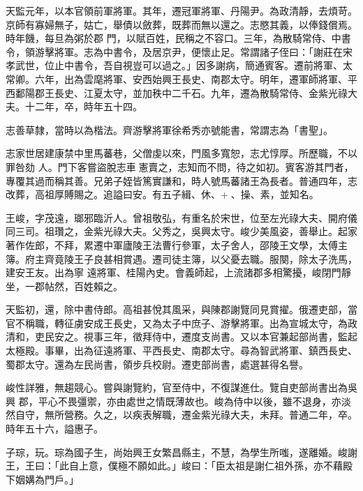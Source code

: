 \begin{pinyinscope}
 天監元年，以本官領前軍將軍。其年，遷冠軍將軍、丹陽尹。為政清靜，去煩苛。京師有寡婦無子，姑亡，舉債以斂葬，既葬而無以還之。志愍其義，以俸錢償焉。時年饑，每旦為粥於郡
 門，以賦百姓，民稱之不容口。三年，為散騎常侍、中書令，領游擊將軍。志為中書令，及居京尹，便懷止足。常謂諸子侄曰：「謝莊在宋孝武世，位止中書令，吾自視豈可以過之。」因多謝病，簡通賓客。遷前將軍、太常卿。六年，出為雲麾將軍、安西始興王長史、南郡太守。明年，遷軍師將軍、平西鄱陽郡王長史、江夏太守，並加秩中二千石。九年，遷為散騎常侍、金紫光祿大夫。十二年，卒，時年五十四。



 志善草隸，當時以為楷法。齊游擊將軍徐希秀亦號能書，常謂志為「書聖」。



 志家世居建康禁中里馬蕃巷，父僧虔以來，門風多寬恕，志尤惇厚。所歷職，不以罪咎劾
 人。門下客嘗盜脫志車憲賣之，志知而不問，待之如初。賓客游其門者，專覆其過而稱其善。兄弟子姪皆篤實謙和，時人號馬蕃諸王為長者。普通四年，志改葬，高祖厚賻賜之。追謚曰安。有五子緝、休、+、操、素，並知名。



 王峻，字茂遠，瑯邪臨沂人。曾祖敬弘，有重名於宋世，位至左光祿大夫、開府儀同三司。祖瓚之，金紫光祿大夫。父秀之，吳興太守。峻少美風姿，善舉止。起家著作佐郎，不拜，累遷中軍廬陵王法曹行參軍，太子舍人，邵陵王文學，太傅主簿。府主齊竟陵王子良甚相賞遇。遷司徒主簿，以父憂去職。服闋，除太子洗馬，建安王友。出為寧
 遠將軍、桂陽內史。會義師起，上流諸郡多相驚擾，峻閉門靜坐，一郡帖然，百姓賴之。



 天監初，還，除中書侍郎。高祖甚悅其風采，與陳郡謝覽同見賞擢。俄遷吏部，當官不稱職，轉征虜安成王長史，又為太子中庶子、游擊將軍。出為宣城太守，為政清和，吏民安之。視事三年，徵拜侍中，遷度支尚書。又以本官兼起部尚書，監起太極殿。事畢，出為征遠將軍、平西長史、南郡太守。尋為智武將軍、鎮西長史、蜀郡太守。還為左民尚書，領步兵校尉。遷吏部尚書，處選甚得名譽。



 峻性詳雅，無趨競心。嘗與謝覽約，官至侍中，不復謀進仕。覽自吏部尚書出為吳興
 郡，平心不畏彊禦，亦由處世之情既薄故也。峻為侍中以後，雖不退身，亦淡然自守，無所營務。久之，以疾表解職，遷金紫光祿大夫，未拜。普通二年，卒。時年五十六，謚惠子。



 子琮，玩。琮為國子生，尚始興王女繁昌縣主，不慧，為學生所嗤，遂離婚。峻謝王，王曰：「此自上意，僕極不願如此。」峻曰：「臣太祖是謝仁祖外孫，亦不藉殿下姻媾為門戶。」




\end{pinyinscope}
